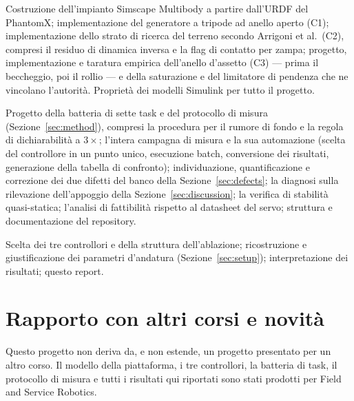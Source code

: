 \documentclass[11pt,a4paper]{article}
\newcommand{\Co}{\textsf{C1}}
\newcommand{\Ct}{\textsf{C2}}
\newcommand{\Cth}{\textsf{C3}}
\begin{document}
\begin{description}[style=unboxed,leftmargin=0pt,font=\normalfont\bfseries]

\item[Studente 1 --- impianto e controllori.]
Costruzione dell'impianto Simscape Multibody a partire dall'URDF del PhantomX;
implementazione del generatore a tripode ad anello aperto (\Co);
implementazione dello strato di ricerca del terreno secondo Arrigoni et al.\
(\Ct), compresi il residuo di dinamica inversa e la flag di contatto per zampa;
progetto, implementazione e taratura empirica dell'anello d'assetto (\Cth) ---
prima il beccheggio, poi il rollio --- e della saturazione e del limitatore di
pendenza che ne vincolano l'autorit\`a. Proprietà dei modelli Simulink per tutto
il progetto.

\item[Studente 2 --- misura, diagnosi e analisi.]
Progetto della batteria di sette task e del protocollo di misura
(Sezione~\ref{sec:method}), compresi la procedura per il rumore di fondo e la
regola di dichiarabilit\`a a $3\times$; l'intera campagna di misura e la sua
automazione (scelta del controllore in un punto unico, esecuzione batch,
conversione dei risultati, generazione della tabella di confronto);
individuazione, quantificazione e correzione dei due difetti del banco della
Sezione~\ref{sec:defects}; la diagnosi sulla rilevazione dell'appoggio della
Sezione~\ref{sec:discussion}; la verifica di stabilit\`a quasi-statica; l'analisi
di fattibilit\`a rispetto al datasheet del servo; struttura e documentazione del
repository.

\item[In comune.]
Scelta dei tre controllori e della struttura dell'ablazione; ricostruzione e
giustificazione dei parametri d'andatura (Sezione~\ref{sec:setup});
interpretazione dei risultati; questo report.

\end{description}

\section{Rapporto con altri corsi e novit\`a}
\label{sec:novelty}

Questo progetto non deriva da, e non estende, un progetto presentato per un
altro corso. Il modello della piattaforma, i tre controllori, la batteria di
task, il protocollo di misura e tutti i risultati qui riportati sono stati
prodotti per Field and Service Robotics.
\end{document}
